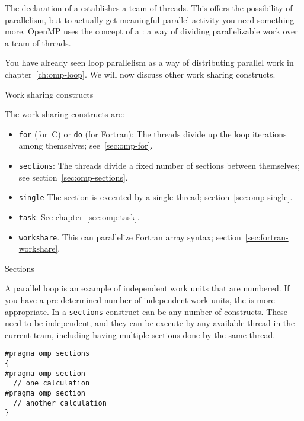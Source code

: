 
The declaration of a  establishes a team of
threads. This offers the possibility of parallelism, but to actually
get meaningful parallel activity you need something more.
OpenMP uses the concept of a : a way of dividing parallelizable work over a team of threads.

You have already seen loop parallelism
as a way of distributing parallel work
in chapter~\ref{ch:omp-loop}.
We will now discuss other work sharing constructs.

 {Work sharing constructs}
\label{sec:work-sharing}

The work sharing constructs are:
\begin{itemize}
\item \texttt{for} (for~C) or
  \texttt{do} (for Fortran): The threads divide up the loop iterations among
  themselves; see~\ref{sec:omp-for}.
\item \texttt{sections}: The threads divide a fixed number of sections
  between themselves; see section~\ref{sec:omp-sections}.
\item \texttt{single} The section is executed by a single thread;
  section~\ref{sec:omp-single}.
\item \texttt{task}: See chapter~\ref{sec:omp:task}.
\item \texttt{workshare}. This can parallelize Fortran array syntax;
  section~\ref{sec:fortran-workshare}.
\end{itemize}

 {Sections}
\label{sec:omp-sections}

A parallel loop is an example of independent work units that are numbered.
If you have a pre-determined number of independent work units, 
the  is more appropriate. In a \lstinline{sections} construct
can be any number of  constructs. These need to be
independent, and they can be execute by any available thread in the current team,
including having multiple sections done by the same thread.
\begin{lstlisting}
#pragma omp sections
{
#pragma omp section
  // one calculation
#pragma omp section
  // another calculation
}
\end{lstlisting}

